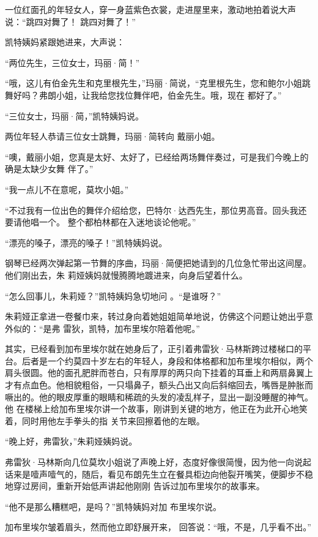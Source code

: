\documentclass{article}
\begin{document}
一位红面孔的年轻女人，穿一身蓝紫色衣裳，走进屋里来，激动地拍着说大声说：“跳四对舞了！
跳四对舞了！” 


凯特姨妈紧跟她进来，大声说： 


\newpage

“两位先生，三位女士，玛丽·简！” 

“哦，这儿有伯金先生和克里根先生，”玛丽·简说，“克里根先生，您和鲍尔小姐跳舞好吗？弗朗小姐，让我给您找位舞伴吧，伯金先生。哦，现在
都好了。” 


“三位女士，玛丽·简，”凯特姨妈说。 

两位年轻人恭请三位女士跳舞，玛丽·简转向
戴丽小姐。 

“噢，戴丽小姐，您真是太好、太好了，已经给两场舞伴奏过，可是我们今晚上的确是太缺少女舞
伴了。” 


“我一点儿不在意呢，莫坎小姐。” 

“不过我有一位出色的舞伴介绍给您，巴特尔·达西先生，那位男高音。回头我还要请他唱一个。
整个都柏林都在入迷地谈论他呢。” 

\newpage

“漂亮的嗓子，漂亮的嗓子！”凯特姨妈说。

钢琴已经两次弹起第一节舞的序曲，玛丽·简便把她请到的几位急忙带出这间屋。他们刚出去，朱
莉娅姨妈就慢腾腾地踱进来，向身后望着什么。 

“怎么回事儿，朱莉娅？”凯特姨妈急切地问
。“是谁呀？” 

朱莉娅正拿进一卷餐巾来，转过身向着她姐姐简单地说，仿佛这个问题让她出乎意外似的：“是弗
雷狄，凯特，加布里埃尔陪着他呢。” 

其实，已经看到加布里埃尔就在她身后了，正引着弗雷狄·马林斯跨过楼梯口的平台。后者是一个约莫四十岁左右的年轻人，身段和体格都和加布里埃尔相似，两个肩头很圆。他的面孔肥胖而苍白，只有厚厚的两只向下挂着的耳垂上和两扇鼻翼上才有点血色。他相貌粗俗，一只塌鼻子，额头凸出又向后斜缩回去，嘴唇是肿胀而噘出的。他的眼皮厚重的眼睛和稀疏的头发的凌乱样子，显出一副没睡醒的神气。他
\newpage
在楼梯上给加布里埃尔讲一个故事，刚讲到关键的地方，他正在为此开心地笑着，同时用他左手拳头的指
关节来回擦着他的左眼。 


“晚上好，弗雷狄，”朱莉娅姨妈说。 

弗雷狄·马林斯向几位莫坎小姐说了声晚上好，态度好像很简慢，因为他一向说起话来是噎声噎气的，随后，看见布朗先生立在餐具柜边向他裂开嘴笑，便脚步不稳地穿过房间，重新开始低声讲起他刚刚
告诉过加布里埃尔的故事来。 

“他不是那么糟糕吧，是吗？”凯特姨妈对加
布里埃尔说。 

加布里埃尔皱着眉头，然而他立即舒展开来，
回答说：“哦，不是，几乎看不出。” 
\end{document}
